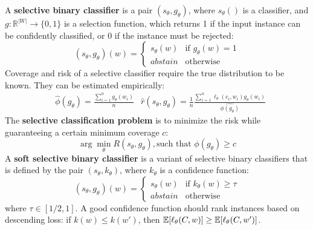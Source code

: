 A \textbf{selective binary classifier} is a pair $(s_{\theta}, g_{\theta})$, where $s_{\theta}()$ is a classifier, and $g:\mathbb{R}^{|W|} \to \{0,1\}$ is a selection function, which returns 1 if the input instance can be confidently classified, or 0 if the instance must be rejected:
\begin{equation*}
    (s_{\theta}, g_{\theta})(w) =
    \begin{cases}
        s_{\theta}(w) &\text{if } g_{\theta}(w) = 1 \\
        \textit{abstain} &\text{otherwise} 
    \end{cases}
\end{equation*}
Coverage and risk of a selective classifier require the true distribution to be known. They can be estimated empirically:
\begin{align*}
    &\hat{\phi}(g_{\theta}) = \frac{\sum_{i=1}^n g_{\theta}(w_i)}{n} &\hat{r}(s_{\theta}, g_{\theta}) = \frac{1}{n}\frac{\sum_{i=1}^n \ell_{\theta}(c_i, w_i) g_{\theta}(w_i)}{\hat{\phi(g_{\theta})}}
\end{align*}
The \textbf{selective classification problem} is to minimize the risk while guaranteeing a certain minimum coverage $c$:
\begin{equation*}
    \arg \min_{\theta} R(s_{\theta}, g_{\theta}), \text{such that }\phi(g_{\theta}) \geq c
\end{equation*}
A \textbf{soft selective binary classifier} is a variant of selective binary classifiers that is defined by the pair $(s_{\theta}, k_{\theta})$, where $k_{\theta}$ is a confidence function:
\begin{equation*}
    (s_{\theta}, g_{\theta})(w) =
    \begin{cases}
        s_{\theta}(w) &\text{if } k_{\theta}(w) \geq \tau \\
        \textit{abstain} &\text{otherwise} 
    \end{cases}
\end{equation*}
where $\tau \in [1/2, 1]$. A good confidence function should rank instances based on descending loss: if $k(w) \leq k(w')$, then $\mathbb{E}[\ell_{\theta}(C,w)] \geq \mathbb{E}[\ell_{\theta}(C, w')]$.

